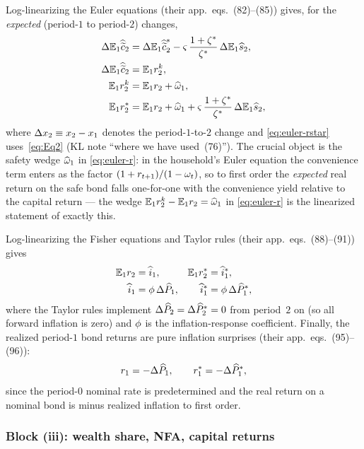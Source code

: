Log-linearizing the Euler equations (their app.~eqs.~(82)--(85)) gives, for the
\emph{expected} (period-$1$ to period-$2$) changes,
\begin{align}
\Delta\mathbb{E}_1\widehat{\widetilde{c}}_2 &= \Delta\mathbb{E}_1\widehat{\widetilde{c}}^{*}_2 - \varsigma\,\frac{1+\zeta^{*}}{\zeta^{*}}\,\Delta\mathbb{E}_1\widehat{s}_2, \label{eq:euler-cc}\\
\Delta\mathbb{E}_1\widehat{\widetilde{c}}_2 &= \mathbb{E}_1r^{k}_2, \label{eq:euler-rk}\\
\mathbb{E}_1r^{k}_2 &= \mathbb{E}_1r_2 + \widehat{\omega}_1, \label{eq:euler-r}\\
\mathbb{E}_1r^{*}_2 &= \mathbb{E}_1r_2 + \widehat{\omega}_1 + \varsigma\,\frac{1+\zeta^{*}}{\zeta^{*}}\,\Delta\mathbb{E}_1\widehat{s}_2, \label{eq:euler-rstar}
\end{align}
where $\Delta x_2 \equiv x_2-x_1$ denotes the period-$1$-to-$2$ change and
\eqref{eq:euler-rstar} uses~\eqref{eq:Eq2} (KL note ``where we have used~(76)'').
The crucial object is the safety wedge $\widehat{\omega}_1$ in \eqref{eq:euler-r}: in
the household's Euler equation the convenience term enters as the factor
$(1+r_{t+1})/(1-\omega_t)$, so to first order the \emph{expected} real return on
the safe bond falls one-for-one with the convenience yield relative to the
capital return --- the wedge $\mathbb{E}_1r^{k}_2-\mathbb{E}_1r_2=\widehat{\omega}_1$ in
\eqref{eq:euler-r} is the linearized statement of exactly this.

Log-linearizing the Fisher equations and Taylor rules (their app.~eqs.~(88)--(91))
gives
\begin{align}
\mathbb{E}_1r_2 &= \widehat{i}_1, & \mathbb{E}_1r^{*}_2 &= \widehat{i}^{*}_1, \label{eq:fisher}\\
\widehat{i}_1 &= \phi\,\Delta\widehat{P}_1, & \widehat{i}^{*}_1 &= \phi\,\Delta\widehat{P}^{*}_1, \label{eq:taylor}
\end{align}
where the Taylor rules implement $\Delta\widehat{P}_2=\Delta\widehat{P}^{*}_2=0$ from period~$2$
on (so all forward inflation is zero) and $\phi$ is the inflation-response
coefficient. Finally, the realized period-$1$ bond returns are pure inflation
surprises (their app.~eqs.~(95)--(96)):
\begin{equation}
r_1 = -\Delta\widehat{P}_1, \qquad r^{*}_1 = -\Delta\widehat{P}^{*}_1, \label{eq:realized-bond}
\end{equation}
since the period-$0$ nominal rate is predetermined and the real return on a
nominal bond is minus realized inflation to first order.

\subsubsection{Block (iii): wealth share, NFA, capital returns}

